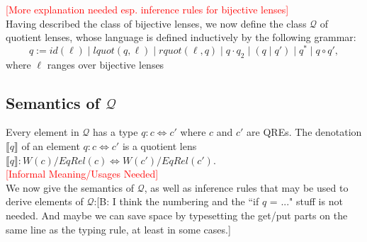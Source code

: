 \documentclass{svproc}
\newcommand{\FINISH}[3]{\ifdraft\textcolor{#1}{[#2: #3]}\fi}
\newcommand{\bcp}[1]{\FINISH{dkred}{B}{#1}}
\newcommand{\sep}{\ensuremath{\; | \;}}
\begin{document}
\textcolor{red}{[More explanation needed esp. inference rules for bijective
lenses]}\\
Having described the class of bijective lenses, we now define the class
$\mathcal{Q}$ of quotient lenses, whose language is defined inductively by the
following grammar:
$$ q := id(\ell) \sep lquot(q, \ell) \sep rquot(\ell, q) \sep q
\cdot q_2 \sep (q \sep q') \sep q^* \sep q \circ q',$$
where $\ell$ ranges over bijective lenses 
\subsection{Semantics of $\mathcal{Q}$}
Every element in $\mathcal{Q}$ has a type $q :
c \Longleftrightarrow c'$ where $c$ and $c'$ are QREs. The denotation
$\llbracket q \rrbracket$ of an element $q : c \Longleftrightarrow c'$ is a
quotient lens $\llbracket q \rrbracket :
W(c)/{EqRel(c)} \Longleftrightarrow W(c')/{EqRel(c')}$.\\
\textcolor{red}{[Informal Meaning/Usages Needed]}\\We now give the
semantics of $\mathcal{Q}$, as well as inference rules that may be used to
derive elements of $\mathcal{Q}$:\bcp{I think the numbering and the ``if $q$
  = ..." stuff is not needed.  And maybe we can save space by typesetting the
  get/put parts on the same line as the typing rule, at least in some cases.}
\end{document}
